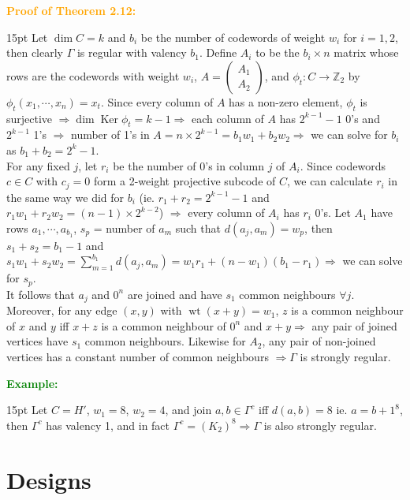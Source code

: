 \documentclass[12pt]{article}
\newcommand{\noparskip}{\vspace{-\parskip}}
\newenvironment{dent}
	{\begin{adjustwidth}{15pt}{}\noparskip}
	{\end{adjustwidth}}
\newenvironment{proof}[1]
	{\textcolor{Orange}{\textbf{Proof of #1:}}\begin{dent}}
	{\end{dent}}
\newenvironment{example}
	{\textcolor{Green}{\textbf{Example:}}\begin{dent}}
	{\end{dent}}
\renewcommand{\implies}{\Rightarrow}
\newcommand{\Z}{\mathbb{Z}}
\newcommand{\wt}[1]{\operatorname{wt}(#1)}
\renewcommand{\ker}{\operatorname{Ker}}
\begin{document}
\begin{proof}{Theorem 2.12}
Let $\dim C = k$ and $b_i$ be the number of codewords of weight $w_i$ for $i = 1, 2$, then clearly $\Gamma$ is regular with valency $b_1$. Define $A_i$ to be the $b_i \times n$ matrix whose rows are the codewords with weight $w_i$, $A = \begin{pmatrix} A_1 \\ A_2 \end{pmatrix}$, and $\phi_t: C \rightarrow \Z_2$ by $\phi_t(x_1, \cdots, x_n) = x_t$. Since every column of $A$ has a non-zero element, $\phi_t$ is surjective $\implies \dim \ker \phi_t = k - 1 \implies$ each column of $A$ has $2^{k - 1} - 1$ 0's and $2^{k - 1}$ 1's $\implies$ number of 1's in $A = n \times 2^{k - 1} = b_1 w_1 + b_2 w_2 \implies$ we can solve for $b_i$ as $b_1 + b_2 = 2^k - 1$. \\
For any fixed $j$, let $r_i$ be the number of 0's in column $j$ of $A_i$. Since codewords $c \in C$ with $c_j = 0$ form a 2-weight projective subcode of $C$, we can calculate $r_i$ in the same way we did for $b_i$ (ie. $r_1 + r_2 = 2^{k - 1} - 1$ and $r_1 w_1 + r_2 w_2 = (n - 1) \times 2^{k - 2}$) $\implies$ every column of $A_i$ has $r_i$ 0's. Let $A_1$ have rows $a_1, \cdots, a_{b_1}$, $s_p$ = number of $a_m$ such that $d(a_j, a_m) = w_p$, then $s_1 + s_2 = b_1 - 1$ and $s_1 w_1 + s_2 w_2 = \sum_{m = 1}^{b_1} d(a_j, a_m) = w_1 r_1 + (n - w_1)(b_1 - r_1) \implies$ we can solve for $s_p$. \\
It follows that $a_j$ and $0^n$ are joined and have $s_1$ common neighbours $\forall j$. Moreover, for any edge $(x, y)$ with $\wt{x + y} = w_1$, $z$ is a common neighbour of $x$ and $y$ iff $x + z$ is a common neighbour of $0^n$ and $x + y \implies$ any pair of joined vertices have $s_1$ common neighbours. Likewise for $A_2$, any pair of non-joined vertices has a constant number of common neighbours $\implies \Gamma$ is strongly regular.
\end{proof}

\begin{example}
Let $C = H'$, $w_1 = 8$, $w_2 = 4$, and join $a, b \in \Gamma^c$ iff $d(a, b) = 8$ ie. $a = b + 1^8$, then $\Gamma^c$ has valency 1, and in fact $\Gamma^c = (K_2)^8 \implies \Gamma$ is also strongly regular.
\end{example}

\pagebreak

\section{Designs}
\end{document}
